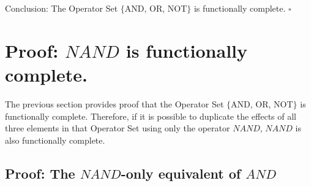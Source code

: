\documentclass{article}
\begin{document}
\bigskip
\bigskip
\bigskip
\hspace*{-\parindent}%
Conclusion: The Operator Set $\{$AND, OR, NOT$\}$ is functionally complete.  $\square$

\newpage
\section{Proof: $NAND$ is functionally complete.}

The previous section provides proof that the Operator Set $\{$AND, OR, NOT$\}$ is functionally complete. Therefore, if it is possible to duplicate the effects of all three elements in that Operator Set using only the operator $NAND$, $NAND$ is also functionally complete. 

\subsection{Proof: The $NAND$-only equivalent of $AND$}
\end{document}
